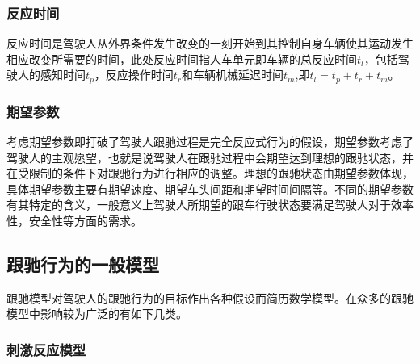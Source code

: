\subsubsection{反应时间}
反应时间是驾驶人从外界条件发生改变的一刻开始到其控制自身车辆使其运动发生相应改变所需要的时间，此处反应时间指人车单元即车辆的总反应时间$t_l$，包括驾驶人的感知时间$t_p$，反应操作时间$t_r$和车辆机械延迟时间$t_m$,即$t_l=t_p+t_r+t_m$。


\subsubsection{期望参数}
考虑期望参数即打破了驾驶人跟驰过程是完全反应式行为的假设，期望参数考虑了驾驶人的主观愿望，也就是说驾驶人在跟驰过程中会期望达到理想的跟驰状态，并在受限制的条件下对跟驰行为进行相应的调整。理想的跟驰状态由期望参数体现，具体期望参数主要有期望速度、期望车头间距和期望时间间隔等。不同的期望参数有其特定的含义，一般意义上驾驶人所期望的跟车行驶状态要满足驾驶人对于效率性，安全性等方面的需求。


%
%

%



\subsection{跟驰行为的一般模型}
跟驰模型对驾驶人的跟驰行为的目标作出各种假设而简历数学模型。在众多的跟驰模型中影响较为广泛的有如下几类。
\subsubsection{刺激反应模型}

